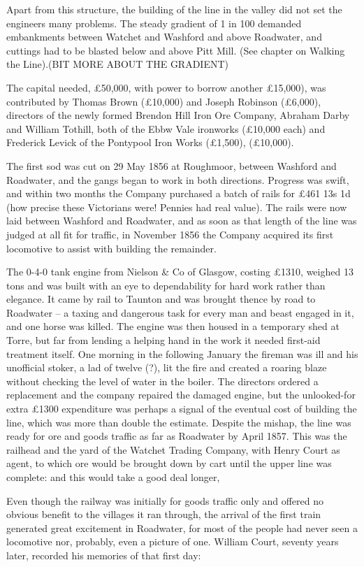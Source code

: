 \documentclass[10pt,a4paper]{article}
\begin{document}
Apart from this structure, the building of the line in the valley did not set the engineers many problems. The steady gradient of 1 in 100 demanded embankments between Watchet and Washford and above Roadwater, and cuttings had to be blasted below and above Pitt Mill. (See chapter on Walking the Line).(BIT MORE ABOUT THE GRADIENT)

The capital needed, £50,000, with power to borrow another £15,000), was contributed by  Thomas Brown (£10,000) and Joseph Robinson (£6,000), directors of the newly formed Brendon Hill Iron Ore Company, Abraham Darby and William Tothill, both of the Ebbw Vale ironworks (£10,000 each) and Frederick Levick  of the Pontypool Iron Works (£1,500), (£10,000).

The first sod was cut on 29 May 1856 at Roughmoor, between Washford and Roadwater, and the gangs began to work in both directions. Progress was swift, and within two months the Company purchased a batch of rails for £461 13s 1d (how precise these Victorians were! Pennies had real value).  The rails were    now laid between Washford and Roadwater, and as soon as that length of the line was judged at all fit for traffic, in November 1856 the Company acquired its first locomotive to assist with building the remainder.

The 0-4-0 tank engine from Nielson \& Co of Glasgow, costing £1310, weighed 13 tons and was built with an eye to dependability for hard work rather than elegance. It came by rail to Taunton and was brought thence by road to Roadwater – a taxing and dangerous task for every man and   beast engaged in it, and one horse was killed. The engine was then housed in a temporary shed at Torre, but far from lending a helping hand in the work it needed first-aid treatment itself. One morning in the following January the fireman was ill and his unofficial stoker, a lad of twelve (?), lit  the fire and created a roaring blaze without checking the level of water in the boiler. The directors ordered a replacement and the company repaired the damaged engine, but the unlooked-for extra £1300 expenditure was perhaps a signal of the eventual cost of building the line, which was more than double the estimate. Despite the mishap, the line was ready for ore and goods traffic as far as Roadwater by April 1857. This was the railhead and the yard of the Watchet Trading Company, with Henry Court as agent, to which ore would be brought down by cart until the upper line was complete: and this would take a good deal longer,

Even though the railway was initially for goods traffic only and offered no obvious benefit to the villages it ran through, the arrival of the first train generated great excitement in Roadwater, for most of the people had never seen a locomotive nor, probably, even a picture of one.  William Court, seventy years later, recorded his memories of that first day: 
\end{document}
